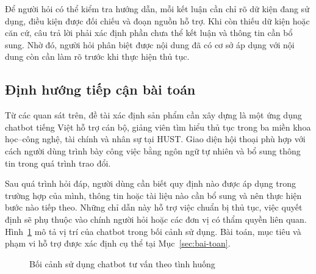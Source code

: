 Để người hỏi có thể kiểm tra hướng dẫn, mỗi kết luận cần chỉ rõ dữ kiện
đang sử dụng, điều kiện được đối chiếu và đoạn nguồn hỗ trợ. Khi còn thiếu
dữ kiện hoặc căn cứ, câu trả lời phải xác định phần chưa thể kết luận và
thông tin cần bổ sung. Nhờ đó, người hỏi phân biệt được nội dung đã có cơ
sở áp dụng với nội dung còn cần làm rõ trước khi thực hiện thủ tục.

\subsection{Định hướng tiếp cận bài toán}
Từ các quan sát trên, đề tài xác định sản phẩm cần xây dựng là một ứng dụng
chatbot tiếng Việt hỗ trợ cán bộ, giảng viên tìm hiểu thủ tục trong ba miền
khoa học--công nghệ, tài chính và nhân sự tại HUST. Giao diện hội thoại phù hợp với cách
người dùng trình bày công việc bằng ngôn ngữ tự nhiên và bổ sung thông tin
trong quá trình trao đổi.

Sau quá trình hỏi đáp, người dùng cần biết quy định nào được áp dụng trong trường
hợp của mình, thông tin hoặc tài liệu nào cần bổ sung và nên thực hiện bước
nào tiếp theo. Những chỉ dẫn này hỗ trợ việc chuẩn bị thủ tục, việc quyết định sẽ phụ thuộc vào chính người hỏi hoặc các đơn vị có thẩm quyền liên quan. Hình~\ref{fig:boi-canh} mô tả vị trí
của chatbot trong bối cảnh sử dụng. Bài toán, mục tiêu và phạm vi hỗ trợ
được xác định cụ thể tại Mục~\ref{sec:bai-toan}.

\begin{figure}[H]
\centering
\caption{Bối cảnh sử dụng chatbot tư vấn theo tình huống}
\label{fig:boi-canh}
\end{figure}
